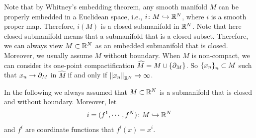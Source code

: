 Note that by Whitney's embedding theorem, any smooth manifold $M$ can be properly embedded in a Euclidean space, i.e., $i \colon M \hookrightarrow \mathbb{R}^N$, where $i$ is a smooth proper map. Therefore, $i(M)$ is a closed submanifold in $\mathbb{R}^N$. Note that here closed submanifold means that a submanifold that is a closed subset. Therefore, we can always view $M \subset \mathbb{R}^N$ as an embedded submanifold that is closed. Moreover, we usually assume $M$ without boundary. When $M$ is non-compact, we can consider its one-point compactification $\widehat{M} = M \cup \left\{\partial_M\right\}$. So $\left\{x_n\right\}_n \subset M$ such that $x_n \rightarrow \partial_M$ in $\widehat{M}$ if and only if $\left\lVert x_n\right\lVert_{\mathbb{R}^N} \rightarrow \infty$.

In the following we always assumed that $M \subset \mathbb{R}^N$ is a submanifold that is closed and without boundary. Moreover, let
\begin{equation*}
    i = (f^1,\cdots,f^N) \colon M \hookrightarrow \mathbb{R}^N
\end{equation*}
and $f^i$ are coordinate functions that $f^i(x) = x^i$.

